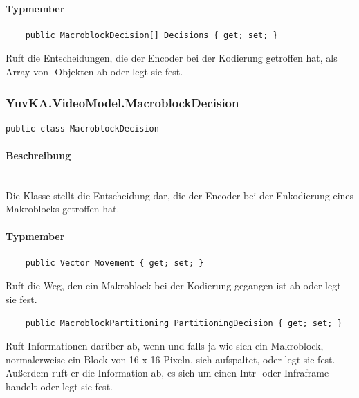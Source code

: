 \paragraph{Typmember}
\begin{itemize}

	\begin{verbatim}
	public MacroblockDecision[] Decisions { get; set; }
	\end{verbatim}
	Ruft die Entscheidungen, die der Encoder bei der Kodierung getroffen hat, als Array von -Objekten ab oder legt sie fest.

\end{itemize}

\subsubsection{YuvKA.VideoModel.MacroblockDecision}

\begin{verbatim}
public class MacroblockDecision
\end{verbatim}

\paragraph{Beschreibung}~\\
Die Klasse  stellt die Entscheidung dar, die der Encoder bei der Enkodierung eines Makroblocks getroffen hat.

\paragraph{Typmember}
\begin{itemize}

	\begin{verbatim}
	public Vector Movement { get; set; }
	\end{verbatim}
	Ruft die Weg, den ein Makroblock bei der Kodierung gegangen ist ab oder legt sie fest.

	\begin{verbatim}
	public MacroblockPartitioning PartitioningDecision { get; set; }
	\end{verbatim}
	Ruft Informationen darüber ab, wenn und falls ja wie sich ein Makroblock, normalerweise ein Block von 16 x 16 Pixeln, sich aufspaltet, oder legt sie fest. Außerdem ruft er die Information ab, es sich um einen Intr- oder Infraframe handelt oder legt sie fest.

\end{itemize}
